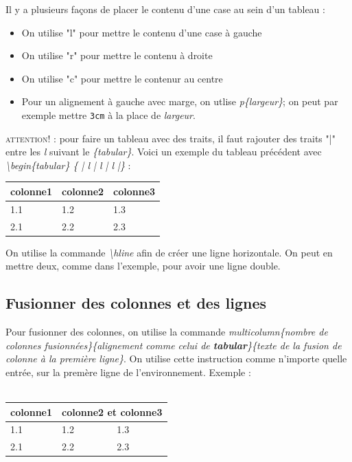 \documentclass[a4paper, 10pt]{book}
\begin{document}
Il y a plusieurs façons de placer le contenu d'une case au sein d'un tableau : 

\begin{itemize}
\item On utilise "l" pour mettre le contenu d'une case à gauche
\item On utilise "r" pour mettre le contenu à droite
\item On utilise "c" pour mettre le contenur au centre
\item Pour un alignement à gauche avec marge, on utlise  \textit{p\{largeur\}}; on peut par exemple mettre \texttt{3cm} à la place de \textit{largeur}.\\
\end{itemize}

\textsc{attention! :} pour faire un tableau avec des traits, il faut rajouter des traits "|" entre les \textit{l} suivant le \textit{\{tabular\}}. Voici un exemple du tableau précédent avec \textit{\textbackslash begin\{tabular\} \{ | l | l | l |\}} :

\begin{tabular}{| l | l | l |}
\hline colonne1 & colonne2 & colonne3\\
\hline \hline
1.1 & 1.2 & 1.3\\
\hline
2.1 & 2.2 & 2.3\\ 
\hline
\end{tabular}

On utilise la commande \textit{\textbackslash hline} afin de créer une ligne horizontale. On peut en mettre deux, comme dans l'exemple, pour avoir une ligne double.

\subsection{Fusionner des colonnes et des lignes}
Pour fusionner des colonnes, on utilise la commande \textit{multicolumn\{nombre de colonnes fusionnées\}\{alignement comme celui de \textbf{tabular}\}\{texte de la fusion de colonne à la première ligne\}}. On utilise cette instruction comme  n'importe quelle entrée, sur la premère ligne de l'environnement. Exemple : \\ \\

\begin{tabular}{| l | l | l |}
\hline colonne1 & \multicolumn{2}{c|}{colonne2 et colonne3}\\
\hline 
1.1 & 1.2 & 1.3\\
\hline
2.1 & 2.2 & 2.3\\ 
\hline 
\end{tabular} \\ \\
\end{document}

